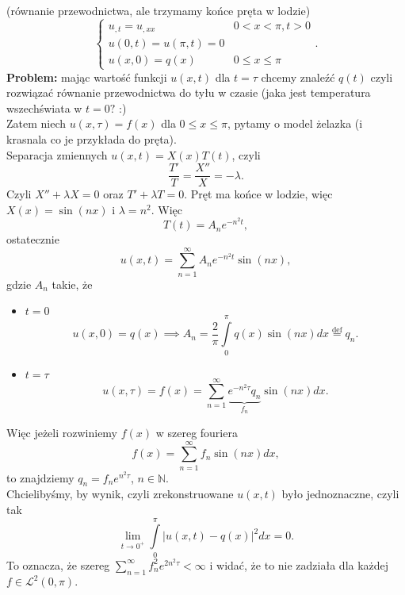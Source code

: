 \documentclass[../main.tex]{subfiles}
\begin{document}
				\begin{przyklad}
						(równanie przewodnictwa, ale trzymamy końce pręta w lodzie)\\
						\[
						\begin{cases}
								u_{,t} = u_{,x x}& 0< x< \pi, t>0\\
								u(0,t) = u(\pi,t) = 0\\
								u(x,0) = q(x)& 0\le x\le \pi
						\end{cases}
						.\]
						\textbf{Problem:} mając wartość funkcji $u(x,t)$ dla $t=\tau$ chcemy znaleźć $q(t)$ czyli rozwiązać równanie przewodnictwa do tyłu w czasie (jaka jest temperatura wszechświata w $t = 0?$ :)\\
						Zatem niech  $u(x,\tau) = f(x)$ dla $0\le x \le \pi$, pytamy o model żelazka (i krasnala co je przykłada do pręta).\\
						Separacja zmiennych $u(x,t) = X(x)T(t)$, czyli
						\[
								\frac{T'}{T} = \frac{X''}{X} = -\lambda
						.\]
						Czyli $X'' + \lambda X = 0$ oraz $T' + \lambda T = 0$. Pręt ma końce w lodzie, więc $X(x) = \sin(nx)$ i $\lambda = n^2$. Więc
						\[
								T(t) = A_n e^{-n^2t}
						,\]
						ostatecznie
						\[
								u(x,t) = \sum_{n=1}^{\infty} A_ne^{-n^2t}\sin(nx)
						,\]
						gdzie $A_n$ takie, że
						\begin{itemize}
								\item $t = 0$ \\
										\[
												u(x,0) = q(x) \implies A_n = \frac{2}{\pi}\int\limits_0^\pi q(x) \sin(nx)dx \overset{\text{def}}{=} q_n
										.\]
								\item $t = \tau$ \\
										\[
												u(x,\tau) = f(x) = \sum_{n=1}^{\infty} \underbrace{e^{-n^2\tau}q_n}_{f_n} \sin(nx)dx
										.\]
						\end{itemize}
						Więc jeżeli rozwiniemy $f(x)$ w szereg fouriera
						\[
								f(x) = \sum_{n=1}^{\infty} f_n \sin(nx)dx
						,\]
						to znajdziemy $q_n = f_n e^{n^2\tau}$, $n\in \mathbb{N}$.\\
						Chcielibyśmy, by wynik, czyli zrekonstruowane $u(x,t)$ było jednoznaczne, czyli tak
						\[
								\lim_{t \to 0^+}\int\limits_0^\pi \left| u(x,t) - q(x) \right| ^2 dx = 0
						.\]
						To oznacza, że szereg $\sum_{n=1}^{\infty} f_n^2e^{2n^2\tau}<\infty$ i widać, że to nie zadziała dla każdej $f\in \mathcal{L}^2(0,\pi).$
				\end{przyklad}
\end{document}
